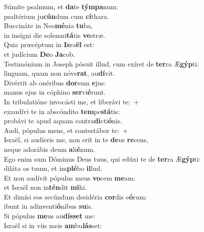 \evenverse Súmite psalmum, et \textbf{da}te \textbf{tým}\textbf{pa}num:~\*\\
\evenverse psaltérium ju\textbf{cún}dum cum \textbf{cí}thara.\\
\oddverse Buccináte in Neo\textbf{mé}nia \textbf{tu}ba,~\*\\
\oddverse in insígni die solemni\textbf{tá}tis \textbf{ve}stræ.\\
\evenverse Quia præcéptum in \textbf{Is}ra\textbf{ël} est:~\*\\
\evenverse et judícium \textbf{De}o \textbf{Ja}cob.\\
\oddverse Testimónium in Joseph pósuit illud, cum exíret de \textbf{ter}ra Æ\textbf{gýp}ti:~\*\\
\oddverse linguam, quam non nóve\textbf{rat}, au\textbf{dí}vit.\\
\evenverse Divértit ab onéribus \textbf{dor}sum \textbf{e}jus:~\*\\
\evenverse manus ejus in cóphino \textbf{ser}vi\textbf{é}runt.\\
\oddverse In tribulatióne invocásti me, et liberávi te:~+\\
\oddverse  exaudívi te in abscóndito \textbf{tem}pe\textbf{stá}tis:~\*\\
\oddverse probávi te apud aquam contra\textbf{di}cti\textbf{ó}nis.\\
\evenverse Audi, pópulus meus, et contestábor te:~+\\
\evenverse  Israël, si audíeris me, non erit in te \textbf{de}us \textbf{re}cens,~\*\\
\evenverse neque adorábis deum \textbf{a}li\textbf{é}num.\\
\oddverse Ego enim sum Dóminus Deus tuus, qui edúxi te de \textbf{ter}ra Æ\textbf{gýp}ti:~\*\\
\oddverse diláta os tuum, et im\textbf{plé}bo \textbf{il}lud.\\
\evenverse Et non audívit pópulus meus \textbf{vo}cem \textbf{me}am:~\*\\
\evenverse et Israël non in\textbf{tén}dit \textbf{mi}hi.\\
\oddverse Et dimísi eos secúndum desidéria \textbf{cor}dis e\textbf{ó}rum:~\*\\
\oddverse ibunt in adinventi\textbf{ó}nibus \textbf{su}is.\\
\evenverse Si pópulus \textbf{me}us au\textbf{dís}\textbf{set} me:~\*\\
\evenverse Israël si in viis meis \textbf{am}bu\textbf{lás}set:\\
